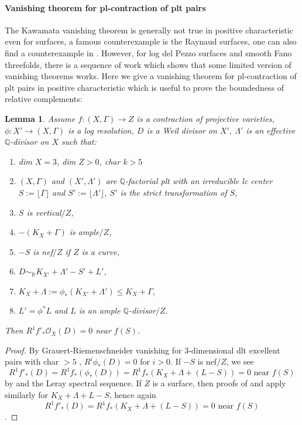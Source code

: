 \documentclass[letterpaper,reqno,12pt]{amsart}
\newcommand{\tbf}{\textbf}
\numberwithin{equation}{section}
\theoremstyle{plain}
\newtheorem{lemma}[theorem]{Lemma}
\begin{document}
\paragraph{\tbf{Vanishing theorem for pl-contraction of plt pairs}}
The Kawamata vanishing theorem is generally not true in positive characteristic even for surfaces, a famous counterexample is the Raynaud surfaces, one can also find a counterexample in \cite{Counterexamplevanishing}. However, for log del Pezzo surfaces and smooth Fano threefolds, there is a sequence of work which shows that some limited version of vanishing theorems works. Here we give a vanishing theorem for pl-contraction of plt pairs in positive characteristic which is useful to prove the boundedness of relative complements:
\begin{lemma}\label{van}
    Assume $f:(X,\Gamma)\to Z$ is a contraction of projective varieties, $\phi:X'\to (X,\Gamma)$ is a log resolution, $D$ is a Weil divisor on $X'$, $\Lambda'$ is an effective $\mathbb Q$-divisor on $X$ such that:
    \begin{enumerate}
        \item dim $X=3$, dim $Z>0$, char $k>5$
        \item $(X,\Gamma)$ and $(X',\Lambda')$ are $\mathbb Q$-factorial plt with an irreducible lc center $S:=\lfloor\Gamma\rfloor$ and $S':=\lfloor \Lambda'\rfloor$, $S'$ is the strict transformation of $S$,
        \item $S$ is vertical$/Z$,
        \item $-(K_X+\Gamma)$ is ample$/Z$,
        \item $-S$ is nef$/Z$ if $Z$ is a curve,
        \item $D\sim_{\mathbb R}K_{X'}+\Lambda'-S'+L'$,
        \item $K_X+\Lambda:=\phi_*(K_{X'}+\Lambda')\leq K_X+\Gamma$,
        \item $L'=\phi^*L$ and $L$ is an ample $\mathbb Q$-divisor$/Z$.
    \end{enumerate}
    Then $R^1f'_*\mathcal O_X(D)=0$ near $f(S)$.
\end{lemma}
\begin{proof}
    By Grauert-Riemenschneider vanishing for 3-dimensional dlt excellent pairs with char $>5$ \cite[3]{BernasconiKollarGRvanishing}, $R^i\phi_*(D)=0$ for $i>0$. If $-S$ is nef$/Z$, we see \[R^1f'_*(D)=R^1f_*(\phi_*(D))=R^1f_*(K_X+\Lambda+(L-S))=0\text{ near }f(S)\] by \cite[1.1]{Bernasconiplvanishing} and the Leray spectral sequence. If $Z$ is a surface, then proofs of \cite[2.2]{Bernasconiplvanishing} and \cite[2.8]{Bernasconibasepointfreeklt} apply similarly for $K_X+\Lambda+L-S$, hence again \[R^1f'_*(D)=R^1f_*(K_X+\Lambda+(L-S))=0\text{ near }f(S)\].
\end{proof}
\end{document}
